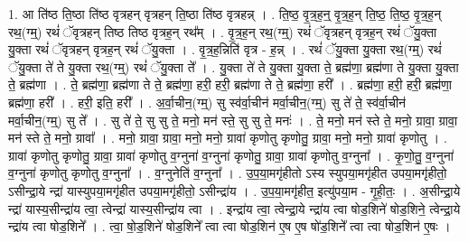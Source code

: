 \documentclass[17pt]{extarticle}
\begin{document}
1. आ ति॑ष्ठ ति॒ष्ठा ति॑ष्ठ वृत्रहन् वृत्रहन् ति॒ष्ठा ति॑ष्ठ वृत्रहन्न् । . ति॒ष्ठ॒ वृ॒त्र॒ह॒न्॒ वृ॒त्र॒ह॒न् ति॒ष्ठ॒ ति॒ष्ठ॒ वृ॒त्र॒ह॒न् रथ॒(ग्म्॒) रथं॑ ॅवृत्रहन् तिष्ठ तिष्ठ वृत्रह॒न् रथ᳚म् । . वृ॒त्र॒ह॒न् रथ॒(ग्म्॒) रथं॑ ॅवृत्रहन् वृत्रह॒न् रथं॑ ॅयु॒क्ता यु॒क्ता रथं॑ ॅवृत्रहन् वृत्रह॒न् रथं॑ ॅयु॒क्ता । . वृ॒त्र॒ह॒न्निति॑ वृत्र - ह॒न्न् । . रथं॑ ॅयु॒क्ता यु॒क्ता रथ॒(ग्म्॒) रथं॑ ॅयु॒क्ता ते॑ ते यु॒क्ता रथ॒(ग्म्॒) रथं॑ ॅयु॒क्ता ते᳚ । . यु॒क्ता ते॑ ते यु॒क्ता यु॒क्ता ते॒ ब्रह्म॑णा॒ ब्रह्म॑णा ते यु॒क्ता यु॒क्ता ते॒ ब्रह्म॑णा । . ते॒ ब्रह्म॑णा॒ ब्रह्म॑णा ते ते॒ ब्रह्म॑णा॒ हरी॒ हरी॒ ब्रह्म॑णा ते ते॒ ब्रह्म॑णा॒ हरी᳚ । . ब्रह्म॑णा॒ हरी॒ हरी॒ ब्रह्म॑णा॒ ब्रह्म॑णा॒ हरी᳚ । . हरी॒ इति॒ हरी᳚ । . अ॒र्वा॒चीन॒(ग्म्॒) सु स्व॑र्वा॒चीन॑ मर्वा॒चीन॒(ग्म्॒) सु ते॑ ते॒ स्व॑र्वा॒चीन॑ मर्वा॒चीन॒(ग्म्॒) सु ते᳚ । . सु ते॑ ते॒ सु सु ते॒ मनो॒ मन॑ स्ते॒ सु सु ते॒ मनः॑ । . ते॒ मनो॒ मन॑ स्ते ते॒ मनो॒ ग्रावा॒ ग्रावा॒ मन॑ स्ते ते॒ मनो॒ ग्रावा᳚ । . मनो॒ ग्रावा॒ ग्रावा॒ मनो॒ मनो॒ ग्रावा॑ कृणोतु कृणोतु॒ ग्रावा॒ मनो॒ मनो॒ ग्रावा॑ कृणोतु । . ग्रावा॑ कृणोतु कृणोतु॒ ग्रावा॒ ग्रावा॑ कृणोतु व॒ग्नुना॑ व॒ग्नुना॑ कृणोतु॒ ग्रावा॒ ग्रावा॑ कृणोतु व॒ग्नुना᳚ । . कृ॒णो॒तु॒ व॒ग्नुना॑ व॒ग्नुना॑ कृणोतु कृणोतु व॒ग्नुना᳚ । . व॒ग्नुनेति॑ व॒ग्नुना᳚ । . उ॒प॒या॒मगृ॑हीतो ऽस्य स्युपया॒मगृ॑हीत उपया॒मगृ॑हीतो॒ ऽसीन्द्रा॒ये न्द्रा॑ यास्युपया॒मगृ॑हीत उपया॒मगृ॑हीतो॒ ऽसीन्द्रा॑य । . उ॒प॒या॒मगृ॑हीत॒ इत्यु॑पया॒म - गृ॒ही॒तः॒ । . अ॒सीन्द्रा॒ये न्द्रा॑ यास्य॒सीन्द्रा॑य त्वा॒ त्वेन्द्रा॑ यास्य॒सीन्द्रा॑य त्वा । . इन्द्रा॑य त्वा॒ त्वेन्द्रा॒ये न्द्रा॑य त्वा षोड॒शिने॑ षोड॒शिने॒ त्वेन्द्रा॒ये न्द्रा॑य त्वा षोड॒शिने᳚ । . त्वा॒ षो॒ड॒शिने॑ षोड॒शिने᳚ त्वा त्वा षोड॒शिन॑ ए॒ष ए॒ष षो॑ड॒शिने᳚ त्वा त्वा षोड॒शिन॑ ए॒षः । \newline
\end{document}
